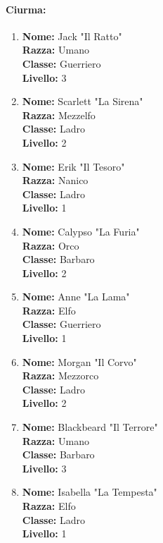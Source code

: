 \documentclass{article}
\begin{document}
\paragraph*{Ciurma:}
\begin{enumerate}
  \item \textbf{Nome:} Jack "Il Ratto"\\
  \textbf{Razza:} Umano\\
  \textbf{Classe:} Guerriero\\
  \textbf{Livello:} 3

  \item \textbf{Nome:} Scarlett "La Sirena"\\
  \textbf{Razza:} Mezzelfo\\
  \textbf{Classe:} Ladro\\
  \textbf{Livello:} 2

  \item \textbf{Nome:} Erik "Il Tesoro"\\
  \textbf{Razza:} Nanico\\
  \textbf{Classe:} Ladro\\
  \textbf{Livello:} 1

  \item \textbf{Nome:} Calypso "La Furia"\\
  \textbf{Razza:} Orco\\
  \textbf{Classe:} Barbaro\\
  \textbf{Livello:} 2

  \item \textbf{Nome:} Anne "La Lama"\\
  \textbf{Razza:} Elfo\\
  \textbf{Classe:} Guerriero\\
  \textbf{Livello:} 1

  \item \textbf{Nome:} Morgan "Il Corvo"\\
  \textbf{Razza:} Mezzorco\\
  \textbf{Classe:} Ladro\\
  \textbf{Livello:} 2

  \item \textbf{Nome:} Blackbeard "Il Terrore"\\
  \textbf{Razza:} Umano\\
  \textbf{Classe:} Barbaro\\
  \textbf{Livello:} 3

  \item \textbf{Nome:} Isabella "La Tempesta"\\
  \textbf{Razza:} Elfo\\
  \textbf{Classe:} Ladro\\
  \textbf{Livello:} 1


\end{enumerate}
\end{document}
